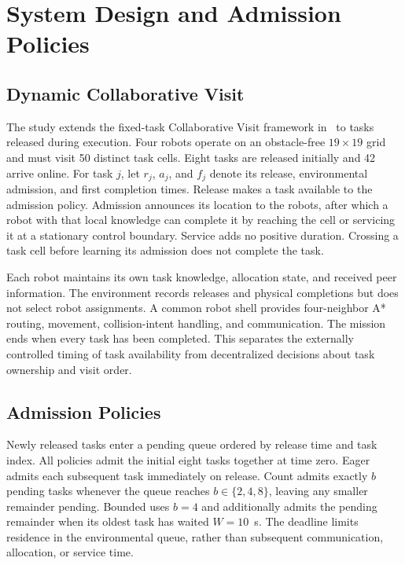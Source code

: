 \documentclass[conference]{IEEEtran}
\begin{document}
\section{System Design and Admission Policies}
\label{sec:system}

\subsection{Dynamic Collaborative Visit}
\label{sec:dynamic_cv}
The study extends the fixed-task Collaborative Visit framework in~\cite{lott2026benchmark} to tasks released during execution. Four robots operate on an obstacle-free $19\times19$ grid and must visit 50 distinct task cells. Eight tasks are released initially and 42 arrive online. For task $j$, let $r_j$, $a_j$, and $f_j$ denote its release, environmental admission, and first completion times. Release makes a task available to the admission policy. Admission announces its location to the robots, after which a robot with that local knowledge can complete it by reaching the cell or servicing it at a stationary control boundary. Service adds no positive duration. Crossing a task cell before learning its admission does not complete the task.

Each robot maintains its own task knowledge, allocation state, and received peer information. The environment records releases and physical completions but does not select robot assignments. A common robot shell provides four-neighbor A* routing, movement, collision-intent handling, and communication. The mission ends when every task has been completed. This separates the externally controlled timing of task availability from decentralized decisions about task ownership and visit order.

\subsection{Admission Policies}
\label{sec:admission}
Newly released tasks enter a pending queue ordered by release time and task index. All policies admit the initial eight tasks together at time zero. Eager admits each subsequent task immediately on release. Count admits exactly $b$ pending tasks whenever the queue reaches $b\in\{2,4,8\}$, leaving any smaller remainder pending. Bounded uses $b=4$ and additionally admits the pending remainder when its oldest task has waited $W=10$~s. The deadline limits residence in the environmental queue, rather than subsequent communication, allocation, or service time.
\end{document}

